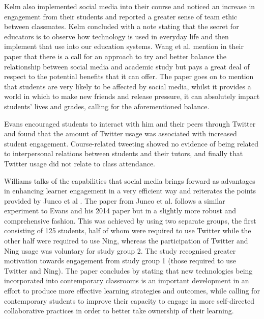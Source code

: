 \documentclass[lettersize,journal]{IEEEtran}
\begin{document}
    Kelm \cite{Kelm2011} also implemented social media into their course and noticed an
    increase in engagement from their students and reported a greater sense of team ethic
    between classmates. Kelm concluded with a note stating that the secret for educators is
    to observe how technology is used in everyday life and then implement that use into
    our education systems.
    Wang et al. \cite{Wang2011} mention in their paper that there is a call for an approach
    to try and better balance the relationship between social media and academic study but
    pays a great deal of respect to the potential benefits that it can offer. The paper goes
    on to mention that students are very likely to be affected by social media, whilst it
    provides a world in which to make new friends and release pressure, it can absolutely
    impact students' lives and grades, calling for the aforementioned balance.

    Evans \cite{Evans2014} encouraged students to interact with him and their peers through
    Twitter and found that the amount of Twitter usage was associated with increased student
    engagement. Course-related tweeting showed no evidence of being related to interpersonal
    relations between students and their tutors, and finally that Twitter usage did not relate
    to class attendance.

    Williams \cite{Williams2022} talks of the capabilities that social media brings
    forward as advantages in enhancing learner engagement in a very efficient way
    and reiterates the points provided by Junco et al \cite{Junco et al 2013}.
    The paper from Junco et al. follows a similar experiment to Evans and his 2014
    paper \cite{Evans2014} but in a slightly more robust and comprehensive fashion.
    This was achieved by using two separate groups, the first consisting of 125
    students, half of whom were required to use Twitter while the other half were
    required to use Ning, whereas the participation of Twitter and Ning usage was
    voluntary for study group 2. The study recognised greater motivation towards
    engagement from study group 1 (those required to use Twitter and Ning). The
    paper concludes by stating that new technologies being incorporated into contemporary
    classrooms is an important development in an effort to produce more effective
    learning strategies and outcomes, while calling for contemporary students to
    improve their capacity to engage in more self-directed collaborative practices
    in order to better take ownership of their learning.
\end{document}
